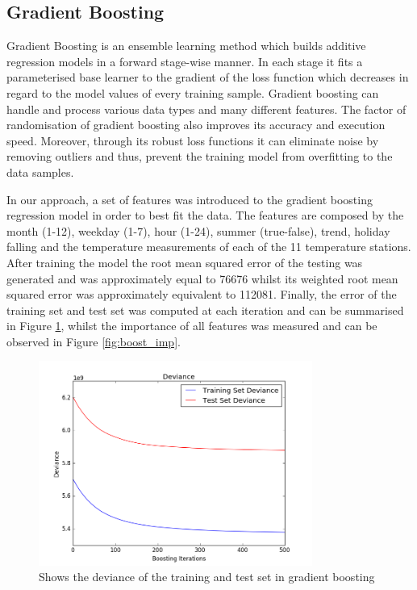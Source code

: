 \documentclass{article} %
\begin{document}
\subsection*{Gradient Boosting}
Gradient Boosting is an ensemble learning method which builds additive regression models in a forward stage-wise manner. In each stage it fits a parameterised base learner to the gradient of the loss function which decreases in regard to the model values of every training sample. Gradient boosting can handle and process various data types and many different features. The factor of randomisation of gradient boosting also improves its accuracy and execution speed. Moreover, through its robust loss functions it can eliminate noise by removing outliers and thus, prevent the training model from overfitting to the data samples.

In our approach, a set of features was introduced to the gradient boosting regression model in order to best fit the data. The features are composed by the month (1-12), weekday (1-7), hour (1-24), summer (true-false), trend, holiday falling and the temperature measurements of each of the 11 temperature stations. After training the model the root mean squared error of the testing was generated and was approximately equal to 76676 whilst its weighted root mean squared error was approximately equivalent to 112081. Finally, the error of the training set and test set was computed at each iteration and can be summarised in Figure \ref{fig:deviance}, whilst the importance of all features was measured and can be observed in Figure \ref{fig:boost_imp}.
\begin{figure}[H]
  \centering
    \includegraphics[width=0.80\textwidth]{deviance}
  \caption{Shows the deviance of the training and test set in gradient boosting}
  \label{fig:deviance}
\end{figure}
\end{document}
